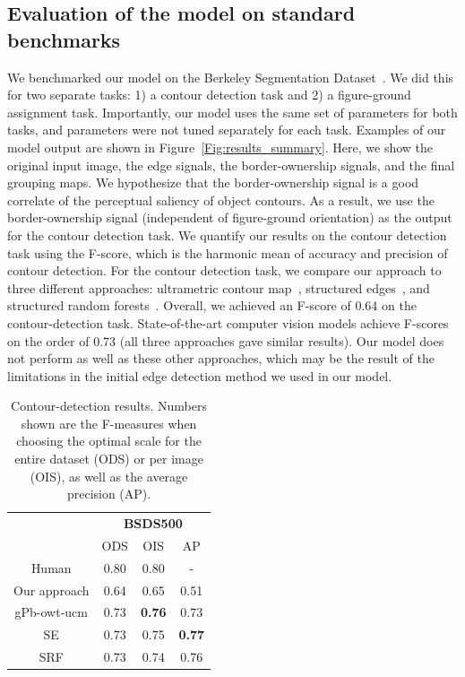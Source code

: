 \subsection{Evaluation of the model on standard benchmarks}
We benchmarked our model on the Berkeley Segmentation Dataset~\citep{Martin_etal01}. We did this for two separate tasks: 1) a contour detection task and 2) a figure-ground assignment task. Importantly, our model uses the same set of parameters for both tasks, and parameters were not tuned separately for each task. Examples of our model output are shown in Figure~\ref{Fig:results_summary}. Here, we show the original input image, the edge signals, the border-ownership signals, and the final grouping maps. We hypothesize that the border-ownership signal is a good correlate of the perceptual saliency of object contours. As a result, we use the border-ownership signal (independent of figure-ground orientation) as the output for the contour detection task. We quantify our results on the contour detection task using the F-score, which is the harmonic mean of accuracy and precision of contour detection. For the contour detection task, we compare our approach to three different approaches: ultrametric contour map~\citep[][gPb-owt-ucm]{Arbeleaz_etal11}, structured edges~\citep[][SE]{Dollar_Zitnick15}, and structured random forests~\citep[][SRF]{Teo_etal15}. Overall, we achieved an F-score of 0.64 on the contour-detection task. State-of-the-art computer vision models achieve F-scores on the order of 0.73 (all three approaches gave similar results). Our model does not perform as well as these other approaches, which may be the result of the limitations in the initial edge detection method we used in our model.

\begin{table}[h!]
\centering
\begin{tabular}{|c|c|c|c| } 
 \cline{2-4}
 \multicolumn{1}{c}{} & \multicolumn{3}{|c|}{\textbf{BSDS500}} \\
 \cline{2-4}
 \multicolumn{1}{c|}{} & ODS & OIS & AP\\ 
 \hline
 Human & 0.80 & 0.80 & -\\ 
 \hline
  Our approach & 0.64 & 0.65 & 0.51 \\
 gPb-owt-ucm & 0.73 & \textbf{0.76} & 0.73 \\
 SE & 0.73 & 0.75 & \textbf{0.77} \\
 SRF & 0.73 & 0.74 & 0.76 \\
 \hline
\end{tabular}
\makeatletter
\let\@currsize\normalsize
\caption[Contour detection results]{Contour-detection results. Numbers shown are the F-measures when choosing the optimal scale for the entire dataset (ODS) or per image (OIS), as well as the average precision (AP).}
\label{tbl:Table1}
\end{table}


